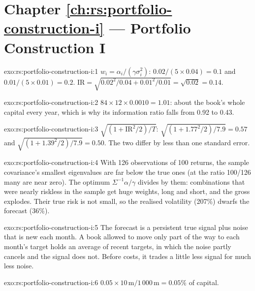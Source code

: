\section*{Chapter \ref{ch:rs:portfolio-construction-i} --- Portfolio Construction I}

\begin{solution}{exo:rs:portfolio-construction-i:1}
$w_i = \alpha_i/(\gamma\sigma_i^2)$: $0.02/(5 \times 0.04) = 0.1$ and $0.01/(5 \times 0.01) = 0.2$. $\mathrm{IR} = \sqrt{0.02^2/0.04 + 0.01^2/0.01} = \sqrt{0.02} = 0.14$.
\end{solution}

\begin{solution}{exo:rs:portfolio-construction-i:2}
$84 \times 12 \times 0.0010 = 1.01$: about the book's whole capital every year, which is why its information ratio falls from 0.92 to 0.43.
\end{solution}

\begin{solution}{exo:rs:portfolio-construction-i:3}
$\sqrt{(1 + \mathrm{IR}^2/2)/T}$: $\sqrt{(1 + 1.77^2/2)/7.9} = 0.57$ and $\sqrt{(1 + 1.39^2/2)/7.9} = 0.50$. The two differ by less than one standard error.
\end{solution}

\begin{solution}{exo:rs:portfolio-construction-i:4}
With 126 observations of 100 returns, the sample covariance's smallest eigenvalues are far below the true ones (at the ratio 100/126 many are near zero). The
optimum $\Sigma^{-1}\alpha/\gamma$ divides by them: combinations that were nearly riskless in the sample get huge weights, long and short, and the gross explodes.
Their true risk is not small, so the realised volatility (207\%) dwarfs the forecast (36\%).
\end{solution}

\begin{solution}{exo:rs:portfolio-construction-i:5}
The forecast is a persistent true signal plus noise that is new each month. A book allowed to move only part of the way to each month's target holds an average of
recent targets, in which the noise partly cancels and the signal does not. Before costs, it trades a little less signal for much less noise.
\end{solution}

\begin{solution}{exo:rs:portfolio-construction-i:6}
$0.05 \times 10\,\mathrm{m}/1\,000\,\mathrm{m} = 0.05\%$ of capital.
\end{solution}

